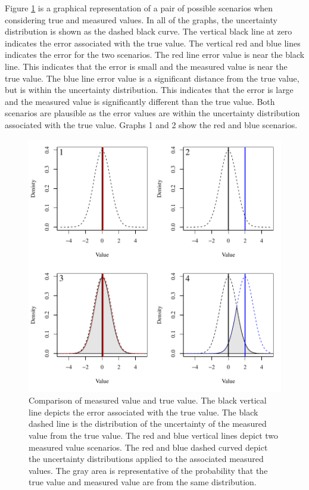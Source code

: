 \begin{linenumbers}
Figure \ref{fig:TV-MVError} is a graphical representation of a pair of possible scenarios when considering true and measured values.  In all of the graphs, the uncertainty distribution is shown as the dashed black curve.  The vertical black line at zero indicates the error associated with the true value.  The vertical red and blue lines indicates the error for the two scenarios.  The red line error value is near the black line.  This indicates that the error is small and the measured value is near the true value.  The blue line error value is a significant distance from the true value, but is within the uncertainty distribution.  This indicates that the error is large and the measured value is significantly different than the true value.  Both scenarios are plausible as the error values are within the uncertainty distribution associated with the true value.  Graphs 1 and 2 show the red and blue scenarios.
\begin{figure}[htbp]
\begin{center}
	\includegraphics[width=6in]{"Figures/TV-MV Error"}
	\caption[Comparison of measured value and true value]{Comparison of measured value and true value.  The black vertical line depicts the error associated with the true value.  The black dashed line is the distribution of the uncertainty of the measured value from the true value.  The red and blue vertical lines depict two measured value scenarios.  The red and blue dashed curved depict the uncertainty distributions applied to the associated measured values.  The gray area is representative of the probability that the true value and measured value are from the same distribution.}
	\label{fig:TV-MVError}
\end{center}
\end{figure}


\end{linenumbers}
